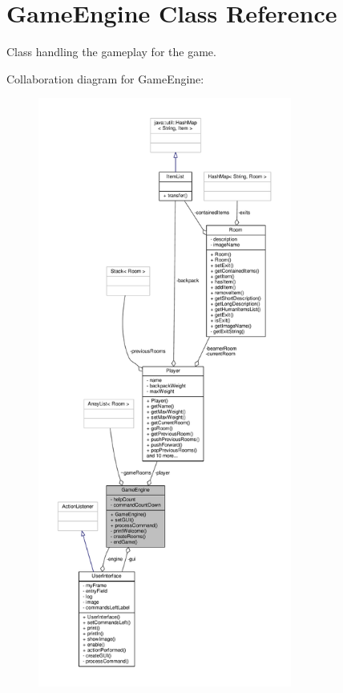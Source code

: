\hypertarget{classGameEngine}{\section{Game\-Engine Class Reference}
\label{classGameEngine}
}


Class handling the gameplay for the game.  




Collaboration diagram for Game\-Engine\-:
\nopagebreak
\begin{figure}[H]
\begin{center}
\leavevmode
\includegraphics[height=550pt]{classGameEngine__coll__graph}
\end{center}
\end{figure}

